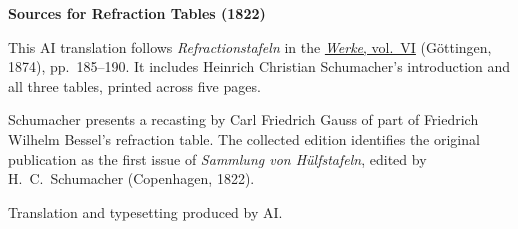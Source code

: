 \clearpage\thispagestyle{empty}
\begin{center}\textbf{Sources for Refraction Tables (1822)}\end{center}
\noindent This AI translation follows \textit{Refractionstafeln} in the \href{https://gdz.sub.uni-goettingen.de/id/PPN236007467}{\textit{Werke}, vol.~VI} (Göttingen, 1874), pp.~185--190. It includes Heinrich Christian Schumacher’s introduction and all three tables, printed across five pages.
\par\smallskip\noindent Schumacher presents a recasting by Carl Friedrich Gauss of part of Friedrich Wilhelm Bessel’s refraction table. The collected edition identifies the original publication as the first issue of \textit{Sammlung von Hülfstafeln}, edited by H.~C.~Schumacher (Copenhagen, 1822).
\par\smallskip\noindent Translation and typesetting produced by AI.
\clearpage
